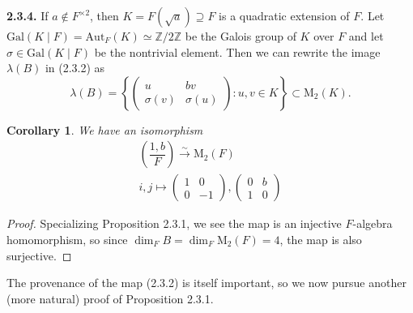 \documentclass{article}
\newtheorem{corollary}[theorem]{Corollary}
\theoremstyle{definition}
\begin{document}
\textbf{2.3.4.} If $a \notin F^{\times 2}$, then $K = F(\sqrt{a}) \supseteq F$ is a quadratic extension of $F$. Let $\mathrm{Gal}(K \mid F) = \mathrm{Aut}_F(K) \simeq \mathbb{Z}/2\mathbb{Z}$ be the Galois group of $K$ over $F$ and let $\sigma \in \mathrm{Gal}(K \mid F)$ be the nontrivial element. Then we can rewrite the image $\lambda(B)$ in (2.3.2) as
$$\lambda(B) = \left\{ \begin{pmatrix} u & bv \\ \sigma(v) & \sigma(u) \end{pmatrix} : u, v \in K \right\} \subset \mathrm{M}_2(K). \tag{2.3.5}$$

\begin{corollary}
We have an isomorphism
\begin{equation}
\begin{array}{l}
\left(\dfrac{1, b}{F}\right) \xrightarrow{\sim} \mathrm{M}_{2}(F) \\[6pt]
i, j \mapsto \begin{pmatrix} 1 & 0 \\ 0 & -1 \end{pmatrix}, \begin{pmatrix} 0 & b \\ 1 & 0 \end{pmatrix}
\end{array} \tag{2.3.7}
\end{equation}
\end{corollary}

\begin{proof}
Specializing Proposition 2.3.1, we see the map is an injective $F$-algebra homomorphism, so since $\dim_F B = \dim_F \mathrm{M}_2(F) = 4$, the map is also surjective.
\end{proof}

The provenance of the map (2.3.2) is itself important, so we now pursue another (more natural) proof of Proposition 2.3.1.
\end{document}
